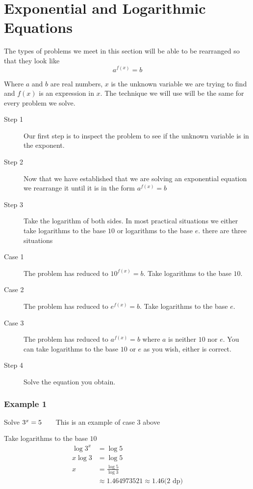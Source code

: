 \section{Exponential and Logarithmic Equations}
The types of problems we meet in this section will be able to be rearranged so that they look like
\begin{equation*}a^{f (x)} =b
\end{equation*}

Where $a$ and $b$ are real numbers, $x$ is the unknown variable we are trying to find and $f (x)$ is an expression in $x$. The technique we will use will be the same for every problem we solve. 


\begin{description}
\item [Step 1] Our first step is to inspect the problem to see if the unknown
variable is in the exponent. 

\item [Step 2] Now that we have
established that we are solving an exponential equation we rearrange it until it is in the form $a^{f (x)} =b$ 

\item [Step 3] Take the logarithm
of both sides. In most practical situations we either take logarithms to the base $10$ or logarithms to the base $e$. there are three situations 

\item [Case
1] The problem has reduced to $10^{f (x)} =b$. Take logarithms to the base $10$. 

\item [Case 2] The problem has
reduced to $e^{f (x)} =b$. Take logarithms to the base $e$. 

\item [Case 3] The problem has
reduced to $a^{f (x)} =b$ where $a$ is neither $10$ nor $e$. You can take logarithms to the base $10$ or $e$ as you wish, either is correct. 

\item [Step 4]
Solve the equation you obtain. \end{description}

\subsubsection{Example 1}
Solve $3^{x} =5\text{\quad \quad }$This is an example of case $3$ above 

Take logarithms to the base $10$
\begin{align*}\log  3^{x} &  = \log  5 \\
x \log  3 &  = \log  5 \\
x &  = \frac{\log  5}{\log  3} \\
 &  \approx 1.464973521 \approx 1.46\text{(2 dp)}\end{align*}

